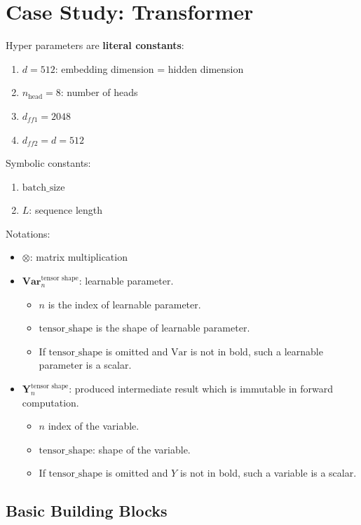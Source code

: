 \section {Case Study: Transformer}

Hyper parameters are \textbf{literal constants}:
\begin{enumerate}
  \item $d = 512$: embedding dimension = hidden dimension
  \item $n_{\text{head}} = 8$: number of heads
  \item $d_{ff1} = 2048$
  \item $d_{ff2} = d = 512$
\end{enumerate}

Symbolic constants:
\begin{enumerate}
  \item $\text{batch\_size}$
  \item $L$: sequence length
\end{enumerate}

Notations:

\begin{itemize}
  \item $\otimes$: matrix multiplication
  \item $\textbf{Var}_{n}^{\text{tensor shape}}$: learnable parameter.
  \begin{itemize}
    \item $n$ is the index of learnable parameter.
    \item $\text{tensor\_shape}$ is the shape of learnable parameter.
    \item If $\text{tensor\_shape}$ is omitted and $\text{Var}$ is not in bold, such a learnable parameter is a scalar.
  \end{itemize}
  \item $\textbf{Y}_{n}^{\text{tensor shape}}$: produced intermediate result which is immutable in forward computation.
  \begin{itemize}
    \item $n$ index of the variable.
    \item $\text{tensor\_shape}$: shape of the variable.
    \item If $\text{tensor\_shape}$ is omitted and $Y$ is not in bold, such a variable is a scalar.
  \end{itemize}

\end{itemize}

\subsection{Basic Building Blocks}

